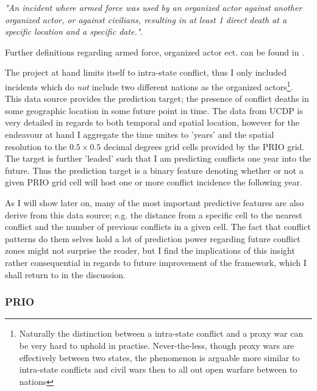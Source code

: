 \documentclass[a4paper]{article}
\begin{document}
\begin{displayquote}

\emph{"An incident where armed force was used by an organized actor against another organized actor, or against civilians, resulting in at least 1 direct death at a specific location and a specific date."}\citep[38]{Croicu_Sundberg_2017}.

\end{displayquote}

Further definitions regarding armed force, organized actor ect. can be found in \cite[10-11]{Croicu_Sundberg_2017}.\par 

The project at hand limits itself to intra-state conflict, thus I only included incidents which do \emph{not} include two different nations as the organized actors\footnote{Naturally the distinction between a intra-state conflict and a proxy war can be very hard to uphold in practise. Never-the-less, though proxy wars are effectively between two states, the phenomenon is arguable more similar to intra-state conflicts and civil wars then to all out open warfare between to nations}. This data source provides the prediction target; the presence of conflict deaths in some geographic location in some future point in time. The data from UCDP is very detailed in regards to both temporal and spatial location, however for the endeavour at hand I aggregate the time unites to 'years' and the spatial resolution to the $0.5\times0.5$ decimal degrees grid cells provided by the PRIO grid. The target is further 'leaded' such that I am predicting conflicts one year into the future. Thus the prediction target is a binary feature denoting whether or not a given PRIO grid cell will host one or more conflict incidence the following year.\par

As I will show later on, many of the most important predictive features are also derive from this data source; e.g. the distance from a specific cell to the nearest conflict and the number of previous conflicts in a given cell. The fact that conflict patterns do them selves hold a lot of prediction power regarding future conflict zones might not surprise the reader, but I find the implications of this insight rather consequential in regards to future improvement of the framework, which I shall return to in the discussion.\par

\subsubsection{PRIO}
\end{document}
